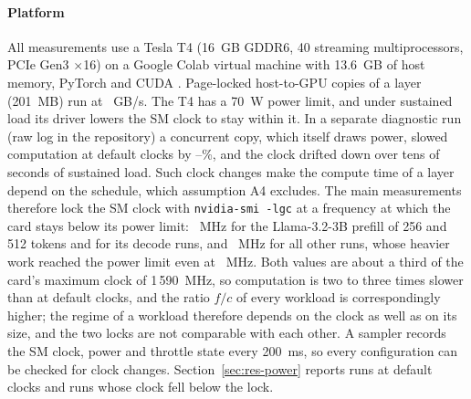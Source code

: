\paragraph{Platform}
All measurements use a Tesla T4 (16~GB GDDR6, 40 streaming multiprocessors, PCIe Gen3 $\times$16) on a Google Colab virtual machine with 13.6~GB of host memory, PyTorch \nTorchVersion{} and CUDA \nCudaVersion. Page-locked host-to-GPU copies of a layer (201~MB) run at \nHwBw~GB/s. The T4 has a 70~W power limit, and under sustained load its driver lowers the SM clock to stay within it. In a separate diagnostic run (raw log in the repository) a concurrent copy, which itself draws power, slowed computation at default clocks by \nConcSlowMinPct--\nConcSlowMaxPct\%, and the clock drifted down over tens of seconds of sustained load. Such clock changes make the compute time of a layer depend on the schedule, which assumption A4 excludes. The main measurements therefore lock the SM clock with \texttt{nvidia-smi -lgc} at a frequency at which the card stays below its power limit: \nClockHighMHz~MHz for the Llama-3.2-3B prefill of 256 and 512 tokens and for its decode runs, and \nClockLowMHz~MHz for all other runs, whose heavier work reached the power limit even at \nClockHighMHz~MHz. Both values are about a third of the card's maximum clock of 1\,590~MHz, so computation is two to three times slower than at default clocks, and the ratio $f/c$ of every workload is correspondingly higher; the regime of a workload therefore depends on the clock as well as on its size, and the two locks are not comparable with each other. A sampler records the SM clock, power and throttle state every 200~ms, so every configuration can be checked for clock changes. Section~\ref{sec:res-power} reports runs at default clocks and runs whose clock fell below the lock.

